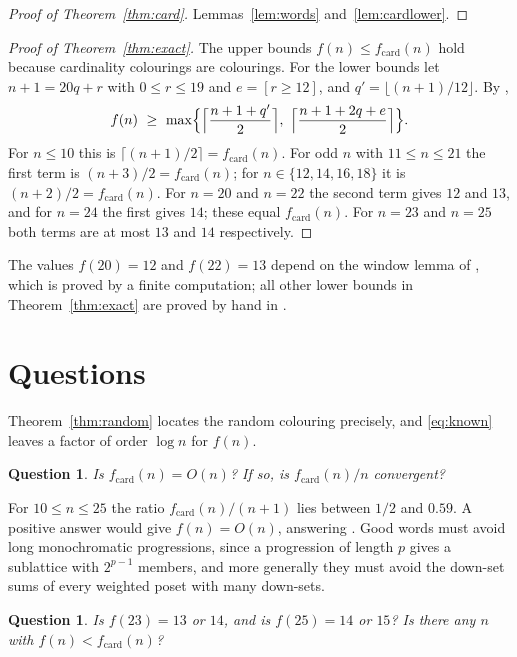 \documentclass[11pt,reqno]{amsart}
\numberwithin{equation}{section}
\theoremstyle{plain}
\newtheorem{question}[theorem]{Question}
\theoremstyle{definition}
\theoremstyle{remark}
\newcommand{\fc}{f_{\mathrm{card}}}
\begin{document}
\begin{proof}[Proof of Theorem~\ref{thm:card}]
Lemmas~\ref{lem:words} and~\ref{lem:cardlower}.
\end{proof}

\begin{proof}[Proof of Theorem~\ref{thm:exact}]
The upper bounds $f(n)\le\fc(n)$ hold because cardinality colourings are
colourings. For the lower bounds let $n+1=20q+r$ with $0\le r\le19$ and
$e=[r\ge12]$, and $q'=\lfloor(n+1)/12\rfloor$. By
\cite[Theorems~1.4 and~7.6]{BMB26v5},
\[
f(n)\ \ge\ \max\Bigl\{\Bigl\lceil\frac{n+1+q'}{2}\Bigr\rceil,\
\Bigl\lceil\frac{n+1+2q+e}{2}\Bigr\rceil\Bigr\}.
\]
For $n\le10$ this is $\lceil(n+1)/2\rceil=\fc(n)$. For odd $n$ with
$11\le n\le21$ the first term is $(n+3)/2=\fc(n)$; for
$n\in\{12,14,16,18\}$ it is $(n+2)/2=\fc(n)$. For $n=20$ and $n=22$ the
second term gives $12$ and $13$, and for $n=24$ the first gives $14$; these
equal $\fc(n)$. For $n=23$ and $n=25$ both terms are at most $13$ and $14$
respectively.
\end{proof}

The values $f(20)=12$ and $f(22)=13$ depend on the window lemma of
\cite[Lemma~7.7]{BMB26v5}, which is proved by a finite computation; all
other lower bounds in Theorem~\ref{thm:exact} are proved by hand in
\cite{BMB26v5}.

\section{Questions}
\label{sec:questions}

Theorem~\ref{thm:random} locates the random colouring precisely, and
\eqref{eq:known} leaves a factor of order $\log n$ for $f(n)$.

\begin{question}
\label{q:card}
Is $\fc(n)=O(n)$? If so, is $\fc(n)/n$ convergent?
\end{question}

For $10\le n\le25$ the ratio $\fc(n)/(n+1)$ lies between $1/2$ and $0.59$.
A positive answer would give $f(n)=O(n)$, answering
\cite[Question~9.3]{BMB26v5}. Good words must avoid long monochromatic
progressions, since a progression of length $p$ gives a sublattice with
$2^{p-1}$ members, and more generally they must avoid the down-set sums of
every weighted poset with many down-sets.

\begin{question}
\label{q:23}
Is $f(23)=13$ or $14$, and is $f(25)=14$ or $15$? Is there any $n$ with
$f(n)<\fc(n)$?
\end{question}
\end{document}
